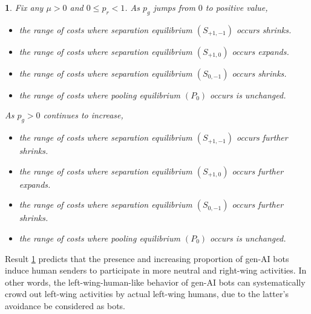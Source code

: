 \documentclass[english,12pt]{article}
\theoremstyle{plain}
\theoremstyle{plain}
\theoremstyle{definition}
\theoremstyle{definition}
\theoremstyle{assumption}
\theoremstyle{plain}
\theoremstyle{plain}
\theoremstyle{plain}
\theoremstyle{plain}
\theoremstyle{definition}%
\theoremstyle{plain}
\theoremstyle{plain}
\theoremstyle{plain}
\newtheorem{result}{\protect\resultname}
\theoremstyle{plain}
\theoremstyle{plain}
\theoremstyle{plain}
\providecommand{\resultname}{Result}
\begin{document}
\begin{result}\label{result:comparative_pg}
    Fix any $\mu>0$ and $0\leq p_r<1$. As $p_g$ jumps from $0$ to positive value, 
    \begin{itemize}
        \item[(i)] the range of costs where separation equilibrium $(S_{+1,-1})$ occurs shrinks.
        \item[(ii)] the range of costs where separation equilibrium $(S_{+1,0})$ occurs expands.
        \item[(iii)] the range of costs where separation equilibrium $(S_{0,-1})$ occurs shrinks.
        \item[(iv)] the range of costs where pooling equilibrium $(P_0)$ occurs is unchanged.
    \end{itemize}
    As $p_g>0$ continues to increase,
    \begin{itemize}
        \item[(i)] the range of costs where separation equilibrium $(S_{+1,-1})$ occurs further shrinks.
        \item[(ii)] the range of costs where separation equilibrium $(S_{+1,0})$ occurs further expands.
        \item[(iii)] the range of costs where separation equilibrium $(S_{0,-1})$ occurs further shrinks.
        \item[(iv)] the range of costs where pooling equilibrium $(P_0)$ occurs is unchanged.
    \end{itemize}
\end{result}

Result \ref{result:comparative_pg} predicts that the presence and increasing proportion of gen-AI bots induce human senders to participate in more neutral and right-wing activities. In other words, the left-wing-human-like behavior of gen-AI bots can systematically crowd out left-wing activities by actual left-wing humans, due to the latter's avoidance be considered as bots.
\end{document}

